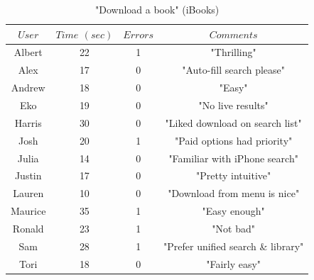 \documentclass[journal, a4paper]{IEEEtran}
\begin{document}
	\begin{table}[!hbt]
		\begin{center}
		\caption{"Download a book" (iBooks)}
		\label{tab:task1learniBooks}
		\begin{tabular}{|c|c|c|c|}
			\hline
			$User$ & $Time$ $(sec)$ & $Errors$ & $Comments$\\
			\hline
            Albert & 22 & 1 & "Thrilling"\\
			\hline
			Alex & 17 & 0 & "Auto-fill search please"\\
			\hline
            Andrew & 18 & 0 & "Easy"\\
			\hline
			Eko & 19 & 0 & "No live results"\\
			\hline
            Harris & 30 & 0 & "Liked download on search list"\\
			\hline
			Josh & 20 & 1 & "Paid options had priority"\\
			\hline
            Julia & 14 & 0 & "Familiar with iPhone search"\\
			\hline
            Justin & 17 & 0 & "Pretty intuitive"\\
			\hline
            Lauren & 10 & 0 & "Download from menu is nice"\\
			\hline
            Maurice & 35 & 1 & "Easy enough"\\
			\hline
            Ronald & 23 & 1 & "Not bad"\\
			\hline
            Sam & 28 & 1 & "Prefer unified search \& library"\\
			\hline
            Tori & 18 & 0 & "Fairly easy"\\
			\hline
		\end{tabular}
		\end{center}
	\end{table}
    
\end{document}
